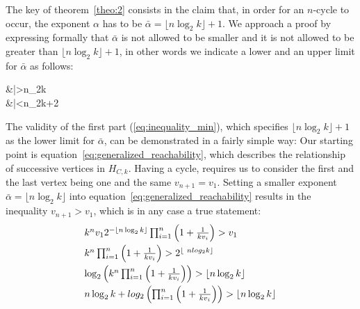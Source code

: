 \documentclass{SciPress_2015}
\begin{document}
\par\medskip
The key of theorem~\ref{theo:2} consists in the claim that, in order for an $n$-cycle to occur, the exponent $\alpha$ has to be $\bar\alpha=\lfloor n\log_2k\rfloor+1$. We approach a proof by expressing formally that $\bar\alpha$ is not allowed to be smaller and it is not allowed to be greater than $\lfloor n\log_2k\rfloor+1$, in other words we indicate a lower and an upper limit for $\bar\alpha$ as follows:

\begin{samepage}
	\begin{flalign}
	\label{eq:inequality_min}
	&\bar\alpha>\lfloor n\log_2k\rfloor\\	
	\label{eq:inequality_max}
	&\bar\alpha<\lfloor n\log_2k\rfloor+2
	\end{flalign}
\end{samepage}

The validity of the first part (\ref{eq:inequality_min}), which specifies $\lfloor n\log_2k\rfloor+1$ as the lower limit for $\bar\alpha$, can be demonstrated in a fairly simple way: Our starting point is equation~\ref{eq:generalized_reachability}, which describes the relationship of successive vertices in $H_{C,k}$. Having a cycle, requires us to consider the first and the last vertex being one and the same $v_{n+1}=v_1$. Setting a smaller exponent $\bar\alpha=\lfloor n\log_2k\rfloor$ into equation~\ref{eq:generalized_reachability} results in the inequality $v_{n+1}>v_1$, which is in any case a true statement:
\begin{equation*}
\begin{array}{l}
k^nv_12^{-\lfloor n\log_2k\rfloor}\prod_{i=1}^{n}\left(1+\frac{1}{kv_{i}}\right)>v_1
\\[\medskipamount]
k^n\prod_{i=1}^{n}\left(1+\frac{1}{kv_{i}}\right)>2^{\lfloor\ nlog_2k\rfloor}
\\[\medskipamount]
\log_2\left(k^n\prod_{i=1}^{n}\left(1+\frac{1}{kv_{i}}\right)\right)>\lfloor n\log_2k\rfloor
\\[\medskipamount]
n\log_2k+log_2\left(\prod_{i=1}^{n}\left(1+\frac{1}{kv_{i}}\right)\right)>\lfloor n\log_2k\rfloor
\end{array}	
\end{equation*}
\end{document}
